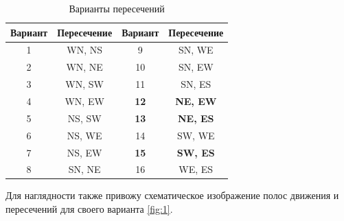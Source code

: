 \documentclass[a4papaer,12pt]{article}
\begin{document}
\begin{table}[h!]
  \centering
  \begin{tabular}{| c | c || c | c |}
    \hline
      \textbf{Вариант}  & \textbf{Пересечение}  & \textbf{Вариант}  & \textbf{Пересечение}   \\
    \hline
            1        &  WN, NS        &  9        &  SN, WE  \\
    \hline
            2        &  WN, NE        &  10        &  SN, EW  \\
    \hline
            3        &  WN, SW        &  11        &  SN, ES  \\
    \hline
            4        &  WN, EW        &  \textbf{12} & \textbf{NE, EW}  \\
    \hline
            5        &  NS, SW        &  \textbf{13} &  \textbf{NE, ES}  \\
    \hline
            6        &  NS, WE        &  14        &  SW, WE  \\
    \hline
            7        &  NS, EW        &  \textbf{15} &  \textbf{SW, ES}  \\
    \hline
            8        &  SN, NE        &  16        &  WE, ES  \\
    \hline
  \end{tabular}
  \caption{Варианты пересечений}
  \label{table:1}
\end{table}

Для наглядности также привожу схематическое изображение полос движения и пересечений для своего
варианта \ref{fig:1}.
\end{document}
